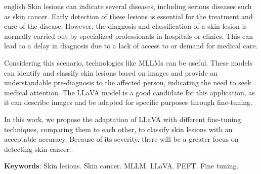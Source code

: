 \begin{resumo}[Abstract]
	\SingleSpacing
	\begin{otherlanguage*}{english}
		Skin lesions can indicate several diseases, including serious diseases such as skin cancer. Early detection of these lesions is essential for the treatment
		and cure of the disease. However, the diagnosis and classification of a skin lesion is normally carried out by specialized professionals in hospitals or clinics.
		This can lead to a delay in diagnosis due to a lack of access to or demand for medical care.

		Considering this scenario, technologies like \acp{MLLM} can be useful. These models can identify and classify skin lesions based on images and provide an
		understandable pre-diagnosis to the affected person, indicating the need to seek medical attention. The \ac{LLaVA} model  is a good candidate for this
		application, as it can describe images and be adapted for specific purposes through fine-tuning.

		In this work, we propose the adaptation of \ac{LLaVA} with different fine-tuning techniques, comparing them to each other, to classify skin lesions with an
		acceptable accuracy. Because of its severity, there will be a greater focus on detecting skin cancer.

		\textbf{Keywords}: Skin lesions. Skin cancer. MLLM. LLaVA. PEFT. Fine tuning.
	\end{otherlanguage*}
\end{resumo}

{
\hypersetup{hidelinks}

\imprimirlistadesiglas

\tableofcontents*
\cleardoublepage
}

